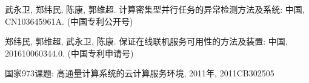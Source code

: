 \begin{resume}
  \begin{achievements}
    \item 武永卫, 郑纬民, 陈康, 郭维超. 计算密集型并行任务的异常检测方法及系统: 
    中国, CN103645961A. (中国专利公开号)
    \item 郑纬民, 郭维超, 武永卫, 陈康. 保证在线联机服务可用性的方法及装置: 
    中国, 201610060344.0. (中国专利申请号)
  \end{achievements}

  \begin{achievements}
    \item 国家973课题: 高通量计算系统的云计算服务环境, 2011年, 2011CB302505
  \end{achievements}

\end{resume}
